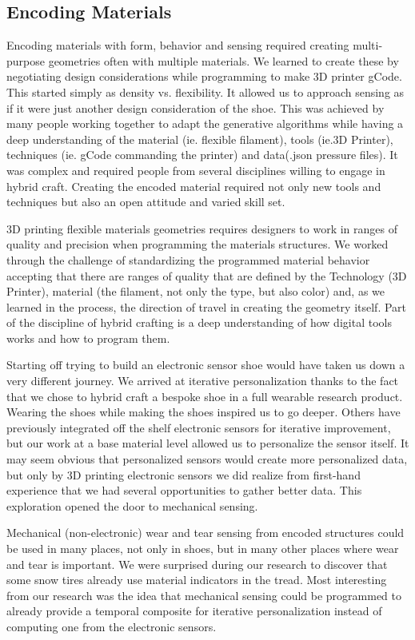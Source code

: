 \subsection{Encoding Materials}
Encoding materials with form, behavior and sensing required creating multi-purpose geometries often with multiple materials. We learned to create these by negotiating design considerations while programming to make 3D printer gCode. This started simply as  density vs. flexibility. It allowed us to approach sensing as if it were just another design consideration of the shoe. This was achieved by many people working together to adapt the generative algorithms while having a deep understanding of the material (ie. flexible filament), tools (ie.3D Printer), techniques (ie. gCode commanding the printer) and data(.json pressure files). It was complex and required people from several disciplines willing to engage in hybrid craft. Creating the encoded material required not only new tools and techniques but also an open attitude and varied skill set.

3D printing flexible materials geometries requires designers to work in ranges of quality and precision when programming the materials structures. We worked through the challenge of standardizing the programmed material behavior accepting that there are ranges of quality that are defined by the Technology (3D Printer), material (the filament, not only the type, but also color) and, as we learned in the process, the direction of travel in creating the geometry itself. Part of the discipline of hybrid crafting is a deep understanding of how digital tools works and how to program them.

Starting off trying to build an electronic sensor shoe would have taken us down a very different journey. We arrived at iterative personalization thanks to the fact that we chose to hybrid craft a bespoke shoe in a full wearable research product. Wearing the shoes while making the shoes inspired us to go deeper. Others have previously integrated off the shelf electronic sensors for iterative improvement, but our work at a base material level allowed us to personalize the sensor itself. It may seem obvious that personalized sensors would create more personalized data, but only by 3D printing electronic sensors we did realize from first-hand experience that we had several opportunities to gather better data. This exploration opened the door to mechanical sensing. 

 Mechanical (non-electronic) wear and tear sensing from encoded structures could be used in many places, not only in shoes, but in many other places where wear and tear is important. We were surprised during our research to discover that some snow tires already use material indicators in the tread. Most interesting from our research was the idea that mechanical sensing could be programmed to already provide a temporal composite for iterative personalization instead of computing one from the electronic sensors. 
 
